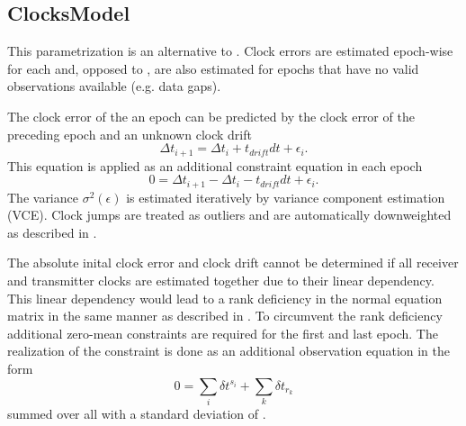 \subsection{ClocksModel}\label{gnssParametrizationType:clocksModel}
This parametrization is an alternative to .
Clock errors are estimated epoch-wise for each 
and, opposed to , are also estimated for epochs
that have no valid observations available (e.g. data gaps).

The clock error of the an epoch can be predicted by the clock error
of the preceding epoch and an unknown clock drift
\begin{equation}
  \Delta t_{i+1} = \Delta t_{i} + t_{drift} dt + \epsilon_i.
\end{equation}
This equation is applied as an additional constraint equation in each epoch
\begin{equation}
   0 = \Delta t_{i+1} - \Delta t_{i} - t_{drift} dt + \epsilon_i.
\end{equation}
The variance $\sigma^2(\epsilon)$ is estimated iteratively by variance component estimation (VCE).
Clock jumps are treated as outliers and are automatically downweighted as described in
.

The absolute inital clock error and clock drift cannot be determined if all receiver
and transmitter clocks are estimated together due to their linear dependency.
This linear dependency would lead to a rank deficiency in the normal equation matrix in the same
manner as described in .
To circumvent the rank deficiency additional zero-mean constraints are required for the first and last epoch.
The realization of the constraint is done as an additional observation equation in the form
\begin{equation}
 0 = \sum_i \delta t^{s_i} + \sum_k \delta t_{r_k}
\end{equation}
summed over all 
with a standard deviation of .


